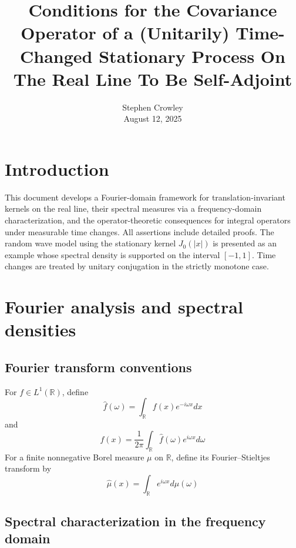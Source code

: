 \documentclass{article}
\newcommand{\tmaffiliation}[1]{\\ #1}
\begin{document}
\title{Conditions for the Covariance Operator of a (Unitarily) Time-Changed
Stationary Process On The Real Line To Be Self-Adjoint}

\author{
  Stephen Crowley
  \tmaffiliation{August 12, 2025}
}

\maketitle

{\tableofcontents}

\section{Introduction}

This document develops a Fourier-domain framework for translation-invariant
kernels on the real line, their spectral measures via a frequency-domain
characterization, and the operator-theoretic consequences for integral
operators under measurable time changes. All assertions include detailed
proofs. The random wave model using the stationary kernel $J_0 (|x|)$ is
presented as an example whose spectral density is supported on the interval
$[- 1, 1]$. Time changes are treated by unitary conjugation in the strictly
monotone case.

\section{Fourier analysis and spectral densities}

\subsection{Fourier transform conventions}

For $f \in L^1 (\mathbb{R})$, define
\begin{equation}
  \hat{f} (\omega) = \int_{\mathbb{R}} f (x) e^{- i \omega x} dx
\end{equation}
and
\begin{equation}
  f (x) = \frac{1}{2 \pi}  \int_{\mathbb{R}} \hat{f} (\omega) e^{i \omega x} d
  \omega
\end{equation}
For a finite nonnegative Borel measure $\mu$ on $\mathbb{R}$, define its
Fourier--Stieltjes transform by
\begin{equation}
  \hat{\mu} (x) = \int_{\mathbb{R}} e^{i \omega x} d \mu (\omega)
\end{equation}

\subsection{Spectral characterization in the frequency domain}
\end{document}
